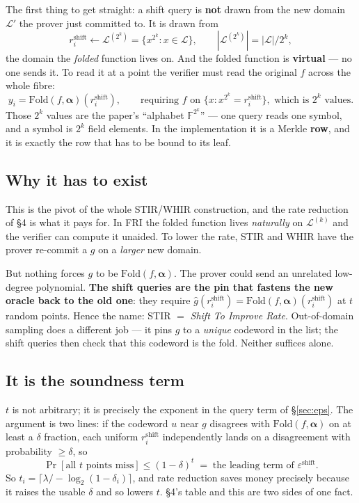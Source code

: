 \documentclass[11pt,a4paper]{article}
\newcommand{\Fold}{\mathrm{Fold}}
\begin{document}
The first thing to get straight: a shift query is \textbf{not} drawn from the new domain
$\mathcal{L}'$ the prover just committed to. It is drawn from
\[
  r^{\mathrm{shift}}_{i}\leftarrow \mathcal{L}^{(2^{k})}=\{x^{2^{k}}:x\in\mathcal{L}\},
  \qquad |\mathcal{L}^{(2^{k})}|=|\mathcal{L}|/2^{k},
\]
the domain the \emph{folded} function lives on. And the folded function is \textbf{virtual} --- no
one sends it. To read it at a point the verifier must read the original $f$ across the whole fibre:
\[
  y_{i}=\Fold(f,\boldsymbol\alpha)(r^{\mathrm{shift}}_{i}),
  \qquad\text{requiring } f \text{ on } \{x: x^{2^{k}}=r^{\mathrm{shift}}_{i}\},
  \text{ which is } 2^{k} \text{ values}.
\]
Those $2^{k}$ values are the paper's ``alphabet $\mathbb{F}^{2^{k}}$'' --- one query reads one
symbol, and a symbol is $2^{k}$ field elements. In the implementation it is a Merkle \textbf{row},
and it is exactly the row that has to be bound to its leaf.

\subsection*{Why it has to exist}

This is the pivot of the whole STIR/WHIR construction, and the rate reduction of \S4 is what
it pays for. In FRI the folded function lives \emph{naturally} on $\mathcal{L}^{(k)}$ and the
verifier can compute it unaided. To lower the rate, STIR and WHIR have the prover re-commit a $g$ on
a \emph{larger} new domain.

But nothing forces $g$ to be $\Fold(f,\boldsymbol\alpha)$. The prover could send an unrelated
low-degree polynomial. \textbf{The shift queries are the pin that fastens the new oracle back to the
old one}: they require $\hat g(r^{\mathrm{shift}}_{i})=\Fold(f,\boldsymbol\alpha)(r^{\mathrm{shift}}_{i})$
at $t$ random points. Hence the name: STIR $=$ \emph{Shift To Improve Rate}. Out-of-domain sampling
does a different job --- it pins $g$ to a \emph{unique} codeword in the list; the shift queries then
check that this codeword is the fold. Neither suffices alone.

\subsection*{It is the soundness term}

$t$ is not arbitrary; it is precisely the exponent in the query term of \S\ref{sec:eps}. The argument is
two lines: if the codeword $u$ near $g$ disagrees with $\Fold(f,\boldsymbol\alpha)$ on at least a
$\delta$ fraction, each uniform $r^{\mathrm{shift}}_{i}$ independently lands on a disagreement with
probability $\ge\delta$, so
\[
  \Pr[\text{all } t \text{ points miss}]\le(1-\delta)^{t}
  \;=\;\text{the leading term of }\varepsilon^{\mathrm{shift}}.
\]
So $t_{i}=\lceil\lambda/-\log_{2}(1-\delta_{i})\rceil$, and rate reduction saves money precisely
because it raises the usable $\delta$ and so lowers $t$. \S4's table and this are two sides of
one fact.
\end{document}
